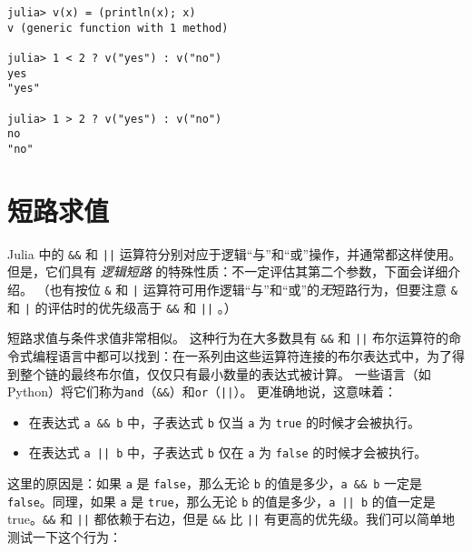 \begin{verbatim}
julia> v(x) = (println(x); x)
v (generic function with 1 method)

julia> 1 < 2 ? v("yes") : v("no")
yes
"yes"

julia> 1 > 2 ? v("yes") : v("no")
no
"no"
\end{verbatim}



\hypertarget{736299957672008833}{}


\section{短路求值}



Julia 中的 \texttt{\&\&} 和 \texttt{||} 运算符分别对应于逻辑“与”和“或”操作，并通常都这样使用。 但是，它们具有 \emph{逻辑短路} 的特殊性质：不一定评估其第二个参数，下面会详细介绍。 （也有按位 \texttt{\&} 和 \texttt{|} 运算符可用作逻辑“与”和“或”的\emph{无}短路行为，但要注意 \texttt{\&} 和 \texttt{|} 的评估时的优先级高于 \texttt{\&\&} 和 \texttt{||} 。）



短路求值与条件求值非常相似。 这种行为在大多数具有 \texttt{\&\&} 和 \texttt{||} 布尔运算符的命令式编程语言中都可以找到：在一系列由这些运算符连接的布尔表达式中，为了得到整个链的最终布尔值，仅仅只有最小数量的表达式被计算。 一些语言（如 Python）将它们称为\texttt{and}（\texttt{\&\&}）和\texttt{or}（\texttt{||}）。 更准确地说，这意味着：



\begin{itemize}
\item 在表达式 \texttt{a \&\& b} 中，子表达式 \texttt{b} 仅当 \texttt{a} 为 \texttt{true} 的时候才会被执行。


\item 在表达式 \texttt{a || b} 中，子表达式 \texttt{b} 仅在 \texttt{a} 为 \texttt{false} 的时候才会被执行。

\end{itemize}


这里的原因是：如果 \texttt{a} 是 \texttt{false}，那么无论 \texttt{b} 的值是多少，\texttt{a \&\& b} 一定是 \texttt{false}。同理，如果 \texttt{a} 是 \texttt{true}，那么无论 \texttt{b} 的值是多少，\texttt{a || b} 的值一定是 true。\texttt{\&\&} 和 \texttt{||} 都依赖于右边，但是 \texttt{\&\&} 比 \texttt{||} 有更高的优先级。我们可以简单地测试一下这个行为：




